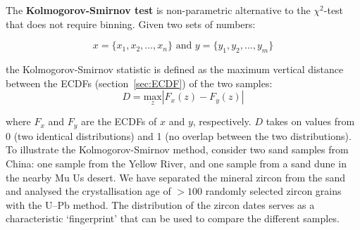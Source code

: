 The \textbf{Kolmogorov-Smirnov test} is non-parametric alternative to
the $\chi^2$-test that does not require binning. Given two sets of
numbers:

\[
x = \{x_1,x_2,\ldots,x_n\} \mbox{~and~} y = \{y_1,y_2,\ldots,y_m\}
\]

\noindent the Kolmogorov-Smirnov statistic is defined as the maximum
vertical distance between the ECDFs (section~\ref{sec:ECDF}) of the
two samples:
\begin{equation}
  D = \underset{z}{\mbox{max}} |F_x(z) - F_y(z)|
  \label{eq:KS}
\end{equation}

\noindent where $F_x$ and $F_y$ are the ECDFs of $x$ and $y$,
respectively.  $D$ takes on values from 0 (two identical
distributions) and 1 (no overlap between the two distributions).\\

To illustrate the Kolmogorov-Smirnov method, consider two sand samples
from China: one sample from the Yellow River, and one sample from a
sand dune in the nearby Mu Us desert. We have separated the mineral
zircon from the sand and analysed the crystallisation age of $>100$
randomly selected zircon grains with the U--Pb method.  The
distribution of the zircon dates serves as a characteristic
`fingerprint' that can be used to compare the different samples.

